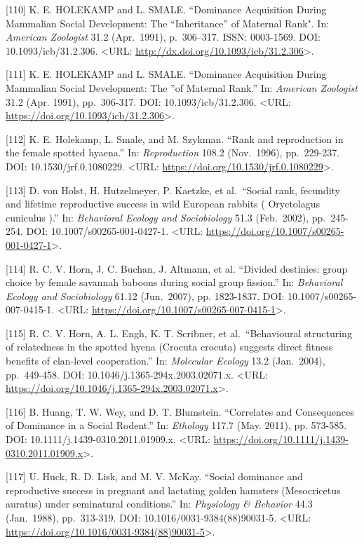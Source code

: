 \documentclass[
]{article}
\begin{document}
{[}110{]} K. E. HOLEKAMP and L. SMALE. ``Dominance Acquisition During
Mammalian Social Development: The ``Inheritance'' of Maternal Rank". In:
\emph{American Zoologist} 31.2 (Apr.~1991), p.~306--317. ISSN:
0003-1569. DOI: 10.1093/icb/31.2.306. \textless URL:
\url{http://dx.doi.org/10.1093/icb/31.2.306}\textgreater.

{[}111{]} K. E. HOLEKAMP and L. SMALE. ``Dominance Acquisition During
Mammalian Social Development: The
\textquotedblleftInheritance\textquotedblright of Maternal Rank.'' In:
\emph{American Zoologist} 31.2 (Apr. 1991), pp.~306-317. DOI:
10.1093/icb/31.2.306. \textless URL:
\url{https://doi.org/10.1093/icb/31.2.306}\textgreater.

{[}112{]} K. E. Holekamp, L. Smale, and M. Szykman. ``Rank and
reproduction in the female spotted hyaena.'' In: \emph{Reproduction}
108.2 (Nov.~1996), pp.~229-237. DOI: 10.1530/jrf.0.1080229.
\textless URL: \url{https://doi.org/10.1530/jrf.0.1080229}\textgreater.

{[}113{]} D. von Holst, H. Hutzelmeyer, P. Kaetzke, et al.~``Social
rank, fecundity and lifetime reproductive success in wild European
rabbits ( Oryctolagus cuniculus ).'' In: \emph{Behavioral Ecology and
Sociobiology} 51.3 (Feb.~2002), pp.~245-254. DOI:
10.1007/s00265-001-0427-1. \textless URL:
\url{https://doi.org/10.1007/s00265-001-0427-1}\textgreater.

{[}114{]} R. C. V. Horn, J. C. Buchan, J. Altmann, et al. ``Divided
destinies: group choice by female savannah baboons during social group
fission.'' In: \emph{Behavioral Ecology and Sociobiology} 61.12
(Jun.~2007), pp. 1823-1837. DOI: 10.1007/s00265-007-0415-1.
\textless URL:
\url{https://doi.org/10.1007/s00265-007-0415-1}\textgreater.

{[}115{]} R. C. V. Horn, A. L. Engh, K. T. Scribner, et
al.~``Behavioural structuring of relatedness in the spotted hyena
(Crocuta crocuta) suggests direct fitness benefits of clan-level
cooperation.'' In: \emph{Molecular Ecology} 13.2 (Jan.~2004),
pp.~449-458. DOI: 10.1046/j.1365-294x.2003.02071.x. \textless URL:
\url{https://doi.org/10.1046/j.1365-294x.2003.02071.x}\textgreater.

{[}116{]} B. Huang, T. W. Wey, and D. T. Blumstein. ``Correlates and
Consequences of Dominance in a Social Rodent.'' In: \emph{Ethology}
117.7 (May. 2011), pp. 573-585. DOI: 10.1111/j.1439-0310.2011.01909.x.
\textless URL:
\url{https://doi.org/10.1111/j.1439-0310.2011.01909.x}\textgreater.

{[}117{]} U. Huck, R. D. Lisk, and M. V. McKay. ``Social dominance and
reproductive success in pregnant and lactating golden hamsters
(Mesocricetus auratus) under seminatural conditions.'' In:
\emph{Physiology \& Behavior} 44.3 (Jan.~1988), pp.~313-319. DOI:
10.1016/0031-9384(88)90031-5. \textless URL:
\url{https://doi.org/10.1016/0031-9384(88)90031-5}\textgreater.
\end{document}
